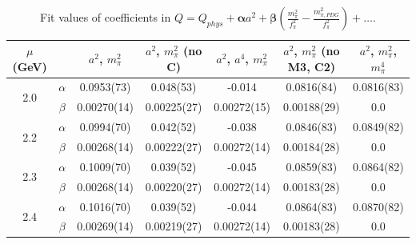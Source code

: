 \documentclass[12pt]{extarticle}
\begin{document}
\begin{table}[h!]
\begin{center}
\begin{tabular}{|c c|c|c|c|c|c|}
\hline
$\mu$ (GeV) &  & $a^2$, $m_\pi^2$& $a^2$, $m_\pi^2$ (no C)& $a^2$, $a^4$, $m_\pi^2$& $a^2$, $m_\pi^2$ (no M3, C2)& $a^2$, $m_\pi^2$, $m_\pi^4$\\
\hline
\multirow{2}{0.5in}{2.0} & $\alpha$ & 0.0953(73)& 0.048(53)& -0.014& 0.0816(84)& 0.0816(83)\\
 & $\beta$ & 0.00270(14)& 0.00225(27)& 0.00272(15)& 0.00188(29)& 0.0\\
\hline
\multirow{2}{0.5in}{2.2} & $\alpha$ & 0.0994(70)& 0.042(52)& -0.038& 0.0846(83)& 0.0849(82)\\
 & $\beta$ & 0.00268(14)& 0.00222(27)& 0.00272(14)& 0.00184(28)& 0.0\\
\hline
\multirow{2}{0.5in}{2.3} & $\alpha$ & 0.1009(70)& 0.039(52)& -0.045& 0.0859(83)& 0.0864(82)\\
 & $\beta$ & 0.00268(14)& 0.00220(27)& 0.00272(14)& 0.00183(28)& 0.0\\
\hline
\multirow{2}{0.5in}{2.4} & $\alpha$ & 0.1016(70)& 0.039(52)& -0.044& 0.0864(83)& 0.0870(82)\\
 & $\beta$ & 0.00269(14)& 0.00219(27)& 0.00272(14)& 0.00183(28)& 0.0\\
\hline
\end{tabular}
\caption{Fit values of coefficients in $Q = Q_{phys} + \mathbf{\alpha} a^2 + \mathbf{\beta}\left(\frac{m_\pi^2}{f_\pi^2}-\frac{m_{\pi,PDG}^2}{f_\pi^2}\right) + \ldots$.}
\end{center}
\end{table}




















\clearpage
\end{document}
